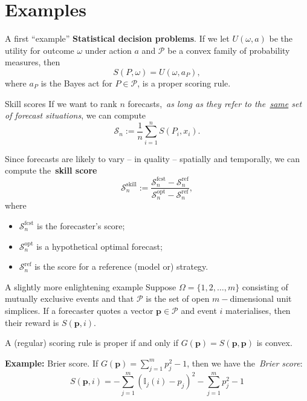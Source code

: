 \section{Examples}
\begin{frame}{A first ``example''}
\textbf{Statistical decision problems}.
If we let $U(\omega, a)$ be the utility for outcome $\omega$ under action $a$ and $\mathcal{P}$ be a convex family of probability measures, then
\[ S(P, \omega) = U(\omega, a_P),\]
where $a_P$ is the Bayes act for $P \in \mathcal{P}$, is a proper scoring rule.
\end{frame}
\begin{frame}{Skill scores}
If we want to rank $n$ forecasts,~\textit{as long as they refer to the~\underline{same} set of forecast situations}, we can compute
\[ \mathcal{S}_n := \frac{1}{n}\sum_{i=1}^n S(P_i, x_i).\]

Since forecasts are likely to vary -- in quality -- spatially and temporally, we can compute the~\textbf{skill score}
\begin{equation}
 \mathcal{S}_n^{\text{skill}} := \frac{\mathcal{S}_n^{\text{fcst}} - \mathcal{S}_n^{\text{ref}}}{\mathcal{S}_n^{\text{opt}} - \mathcal{S}_n^{\text{ref}}},
\end{equation}
where 
\begin{itemize}
 \item $\mathcal{S}_n^{\text{fcst}}$ is the forecaster's score;
 \item $\mathcal{S}_n^{\text{opt}}$ is a hypothetical optimal forecast;
 \item $\mathcal{S}_n^{\text{ref}}$ is the score for a reference (model or) strategy.
\end{itemize}
\end{frame}
\begin{frame}{A slightly more enlightening example}
Suppose $\Omega = \{1, 2, \ldots, m\}$ consisting of mutually exclusive events and that $\mathcal{P}$ is the set of open $m-$dimensional unit simplices. 
If a forecaster quotes a vector $\boldsymbol{p} \in \mathcal{P}$ and event $i$ materialises, then their reward is $S(\boldsymbol{p}, i)$.

\begin{remark}[Convexity]
A (regular) scoring rule is proper if and only if $G(\boldsymbol{p}) = S(\boldsymbol{p}, \boldsymbol{p})$ is convex.
\end{remark}

\textbf{Example:} Brier score.
If $G(\boldsymbol{p}) = \sum_{j=1}^m p_j^2 - 1$, then we have the~\textit{Brier score}:
\begin{equation}
 S(\boldsymbol{p}, i) = -\sum_{j=1}^m \left(\mathbb{I}_j(i) - p_j\right)^2 - \sum_{j=1}^m p_j^2 - 1
\end{equation}

\end{frame}
